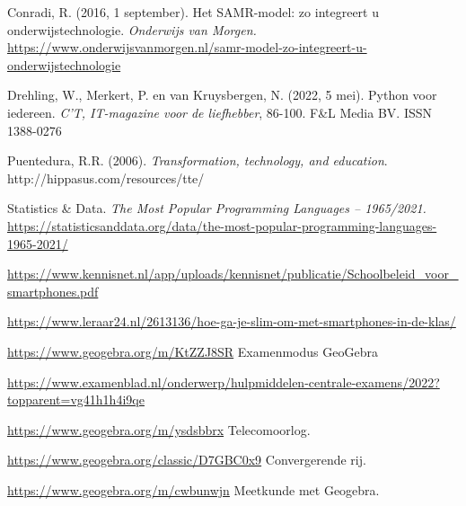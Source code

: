 		
	


\stopcontents[inhoudloep]		%


\begin{bronnen}

\item Conradi, R. (2016, 1 september). Het SAMR-model: zo integreert u onderwijstechnologie. \emph{Onderwijs van Morgen.}
\url{https://www.onderwijsvanmorgen.nl/samr-model-zo-integreert-u-onderwijstechnologie}

\item Drehling, W., Merkert, P. en van Kruysbergen, N. (2022, 5 mei). Python voor iedereen. \emph{C'T, IT-magazine voor de liefhebber}, 86-100. F\&L Media BV. ISSN 1388-0276

\item Puentedura, R.R. (2006).\textit{ Transformation, technology, and education}. http://hippasus.com/resources/tte/

\item Statistics \& Data. \emph{The Most Popular Programming Languages – 1965/2021.}\\
\url{https://statisticsanddata.org/data/the-most-popular-programming-languages-1965-2021/}
\item \url{https://www.kennisnet.nl/app/uploads/kennisnet/publicatie/Schoolbeleid_voor_smartphones.pdf} 
\item \url{https://www.leraar24.nl/2613136/hoe-ga-je-slim-om-met-smartphones-in-de-klas/ } 
\item \url{https://www.geogebra.org/m/KtZZJ8SR} Examenmodus GeoGebra 
\item \url{https://www.examenblad.nl/onderwerp/hulpmiddelen-centrale-examens/2022?topparent=vg41h1h4i9qe}
\item \url{https://www.geogebra.org/m/ysdsbbrx} Telecomoorlog.
\item \url{https://www.geogebra.org/classic/D7GBC0x9} Convergerende rij.
\item \url{https://www.geogebra.org/m/cwbunwjn} Meetkunde met Geogebra.


\end{bronnen}